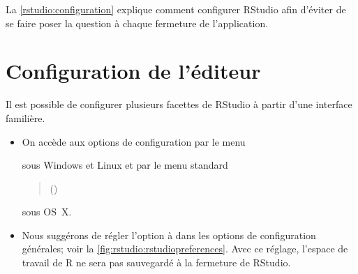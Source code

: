 \begin{enumerate}
  La \autoref{rstudio:configuration} explique comment configurer
  RStudio afin d'éviter de se faire poser la question à chaque
  fermeture de l'application.
\end{enumerate}



\section{Configuration de l'éditeur}
\label{rstudio:configuration}

Il est possible de configurer plusieurs facettes de RStudio à partir
d'une interface familière.
\begin{itemize}
\item On accède aux options de configuration par le menu
  \begin{quote}
  \end{quote}
  sous Windows et Linux et par le menu standard
  \begin{quote}
     (\code{\cmdkey\,,})
  \end{quote}
  sous OS~X.
\item Nous suggérons de régler l'option  à  dans les options de configuration
  générales; voir la \autoref{fig:rstudio:rstudiopreferences}. Avec ce
  réglage, l'espace de travail de R ne sera pas sauvegardé à la
  fermeture de RStudio.
\end{itemize}

